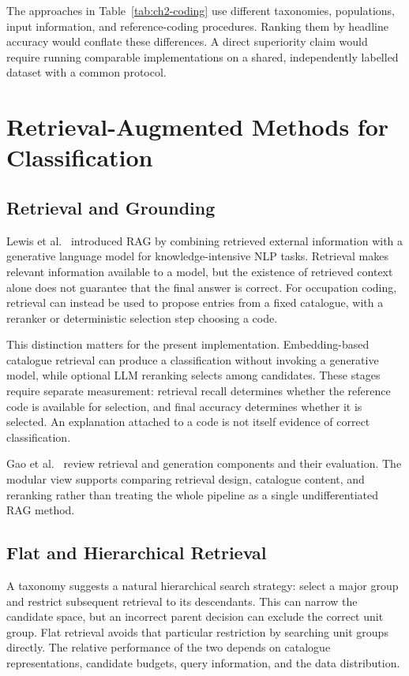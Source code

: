 The approaches in Table~\ref{tab:ch2-coding} use different taxonomies,
populations, input information, and reference-coding procedures. Ranking
them by headline accuracy would conflate these differences. A direct
superiority claim would require running comparable implementations on a
shared, independently labelled dataset with a common protocol.

\section{Retrieval-Augmented Methods for Classification}
\label{sec:rw-rag}

\subsection{Retrieval and Grounding}

Lewis et al.~\cite{lewis2020rag} introduced RAG by combining retrieved
external information with a generative language model for
knowledge-intensive NLP tasks. Retrieval makes relevant information
available to a model, but the existence of retrieved context alone does
not guarantee that the final answer is correct. For occupation coding,
retrieval can instead be used to propose entries from a fixed catalogue,
with a reranker or deterministic selection step choosing a code.

This distinction matters for the present implementation. Embedding-based
catalogue retrieval can produce a classification without invoking a
generative model, while optional LLM reranking selects among candidates.
These stages require separate measurement: retrieval recall determines
whether the reference code is available for selection, and final accuracy
determines whether it is selected. An explanation attached to a code is
not itself evidence of correct classification.

Gao et al.~\cite{gao2024ragsurvey} review retrieval and generation
components and their evaluation. The modular view supports comparing
retrieval design, catalogue content, and reranking rather than treating
the whole pipeline as a single undifferentiated RAG method.

\subsection{Flat and Hierarchical Retrieval}

A taxonomy suggests a natural hierarchical search strategy: select a
major group and restrict subsequent retrieval to its descendants.
This can narrow the candidate space, but an incorrect parent decision
can exclude the correct unit group. Flat retrieval avoids that particular
restriction by searching unit groups directly. The relative performance
of the two depends on catalogue representations, candidate budgets,
query information, and the data distribution.

